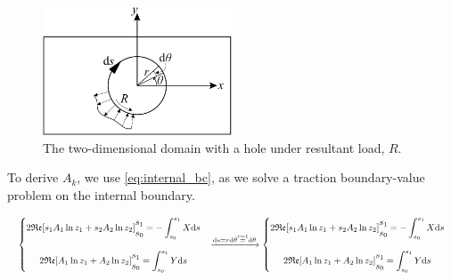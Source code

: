 \documentclass{article}
\begin{document}
\begin{figure}[H]
    \centering
    \includegraphics[width = 0.5\textwidth ]{figures/A_k.pdf}
    \caption{The two-dimensional domain with a hole under resultant load, $R$.}
    \label{fig:domain_A_k}
\end{figure}

To derive $A_k$, we use \cref{eq:internal_bc}, as we solve a traction boundary-value problem on the internal boundary. 

\begin{equation}\resizebox{1\hsize}{!}{$%
    \begin{matrix}
    \left\{\begin{matrix}
    2 \mathfrak{Re}[s_1 A_1 \ln z_1 + s_2 A_2 \ln z_2]
    \begin{matrix}
s_1\\ 
s_0
\end{matrix} = 
-\displaystyle\int_{s_0}^{s_1}{X} \mathrm{d}s\\
    \\
    2 \mathfrak{Re}[A_1 \ln z_1 + A_2 \ln z_2] 
    \begin{matrix}
s_1\\ 
s_0
\end{matrix}
= \displaystyle\int_{s_0}^{s_1}{Y}\mathrm{d}s\\ 
\end{matrix}\right. & \xrightarrow[]{\mathrm{d}s=r\mathrm{d}\theta\overset{r=1}{=}\mathrm{d}\theta}
    \left\{\begin{matrix}
    2 \mathfrak{Re}[s_1 A_1 \ln z_1 + s_2 A_2 \ln z_2]
    \begin{matrix} s_1 \\ s_0 \end{matrix} = 
-\displaystyle\int_{s_0}^{s_1}{X} \mathrm{d}s\\
    \\
    2 \mathfrak{Re}[A_1 \ln z_1 + A_2 \ln z_2] 
    \begin{matrix}  s_1 \\ s_0 \end{matrix}
= \displaystyle\int_{s_0}^{s_1}{Y}\mathrm{d}s\\ 
\end{matrix}\right.
    \end{matrix}$}
    \label{eq:A_k_1}
\end{equation}
\end{document}
